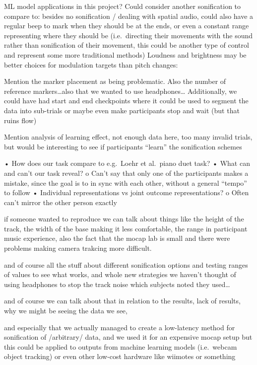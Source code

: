 \documentclass[10pt,a4paper,onecolumn]{article}
\begin{document}
ML model applications in this project?
Could consider another sonification to compare to: besides no sonification / dealing with spatial audio, could also have a regular beep to mark when they should be at the ends, or even a constant range representing where they should be (i.e.~directing their movements with the sound rather than sonification of their movement, this could be another type of control and represent some more traditional methods)
Loudness and brightness may be better choices for modulation targets than pitch changes: \autocite{mcdermottMusicalIntervalsRelative2010}

Mention the marker placement as being problematic. Also the number of reference markers\ldots also that we wanted to use headphones\ldots{}
Additionally, we could have had start and end checkpoints where it could be used to segment the data into sub-trials or maybe even make participants stop and wait (but that ruins flow)

Mention analysis of learning effect, not enough data here, too many invalid trials, but would be interesting to see if participants ``learn'' the sonification schemes

• How does our task compare to e.g.~Loehr et al.~piano duet task?
• What can and can't our task reveal?
o Can't say that only one of the participants makes a mistake, since the goal is to in sync with each other, without a general ``tempo'' to follow
• Individual representations vs joint outcome representations?
o Often can't mirror the other person exactly

if someone wanted to reproduce we can talk about things like the height of the track, the width of the base making it less comfortable, the range in participant music experience, also the fact that the mocap lab is small and there were problems making camera trakcing more difficult.

and of course all the stuff about different sonification options and testing ranges of values to see what works, and whole new strategies we haven't thought of using headphones to stop the track noise which subjects noted they used\ldots{}

and of course we can talk about that in relation to the results, lack of results, why we might be seeing the data we see,

and especially that we actually managed to create a low-latency method for sonification of /arbitrary/ data, and we used it for an expensive mocap setup but this could be applied to outputs from machine learning models (i.e.~webcam object tracking) or even other low-cost hardware like wiimotes or something
\end{document}
